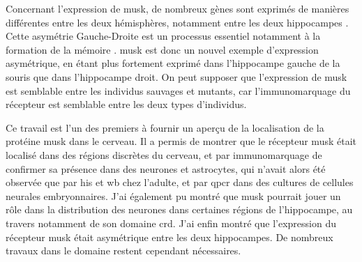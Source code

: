 Concernant l'expression de \gls{musk}, de nombreux gènes sont exprimés de manières différentes entre les deux hémisphères, notamment entre les deux hippocampes \cite{Moskal2006}. Cette asymétrie Gauche-Droite est un processus essentiel notamment à la formation de la mémoire \cite{Shimbo2018}. \gls{musk} est donc un nouvel exemple d'expression asymétrique, en étant plus fortement exprimé dans l'hippocampe gauche de la souris que dans l'hippocampe droit. On peut supposer que l'expression de \gls{musk} est semblable entre les individus sauvages et mutants, car l'immunomarquage du récepteur est semblable entre les deux types d'individus.

Ce travail est l'un des premiers à fournir un aperçu de la localisation de la protéine \gls{musk} dans le cerveau. Il a permis de montrer que le récepteur \gls{musk} était localisé dans des régions discrètes du cerveau, et par immunomarquage de confirmer sa présence dans des neurones et astrocytes, qui n'avait alors été observée que par \gls{his} et \gls{wb} chez l'adulte, et par \gls{qpcr} dans des cultures de cellules neurales embryonnaires. J'ai également pu montré que \gls{musk} pourrait jouer un rôle dans la distribution des neurones dans certaines régions de l'hippocampe, au travers notamment de son domaine \gls{crd}. J'ai enfin montré que l'expression du récepteur \gls{musk} était asymétrique entre les deux hippocampes. De nombreux travaux dans le domaine restent cependant nécessaires.